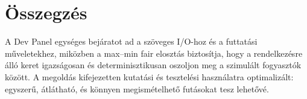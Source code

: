 \section*{Összegzés}
A Dev Panel egységes bejáratot ad a szöveges I/O-hoz és a futtatási műveletekhez, miközben
a max--min fair elosztás biztosítja, hogy a rendelkezésre álló keret igazságosan 
és determinisztikusan oszoljon meg a szimulált fogyasztók között. 
A megoldás kifejezetten kutatási és tesztelési használatra optimalizált: egyszerű, átlátható, 
és könnyen megismételhető futásokat tesz lehetővé.
